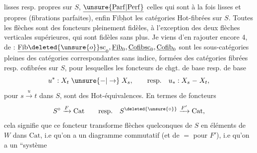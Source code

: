 lisses resp. propres sur $S$, $\underline{\unsure{\mathrm{Parf}|\mathrm{Perf}}}$ celles qui sont à la
fois lisses et propres (fibrations parfaites),
enfin $\underline{\mathrm{Fibhot}}$ les catégories Hot-fibrées sur $S$.
Toutes les flèches sont des foncteurs  pleinement fidèles, à l'exception des deux  flèches
verticales supérieures, qui sont fidèles sans plus.
Je viens d'en rajouter encore 4, de  :
$\underline{\mathrm{Fib}\deleted{\unsure{o}}\mathrm{sc}}_0,\underline{\mathrm{Fib}}_0,\underline{\mathrm{Cofibsc}}_0,\underline{\mathrm{Cofib}}_0$ sont les sous-catégories
pleines des catégories correspondantes sans indice,
formées des catégories fibrées resp. cofibrées  sur
$S$, pour lesquelles les foncteurs de chgt. de base
resp.  de base
\[
u^*:X_t\mathrel{\unsure{-|\to}}X_s,\qquad\text{resp.}\quad u_*:X_s\mathrel{-} X_t,
\]
pour $s\xrightarrow{u}t$ dans $S$, sont des $\mathrm{Hot}$-équivalences.
En termes de foncteurs
\[
S^\circ\xrightarrow{F}\mathrm{Cat}\qquad\text{resp.}\quad S^{\deleted{\unsure{\circ}}}\xrightarrow{F'}\mathrm{Cat},
\]
cela signifie que ce foncteur transforme
flèches quelconques de $S$ en éléments de
$W$ dans $\mathrm{Cat}$,  i.e qu'on a un diagramme
commutatif
(et de $=$ pour $F'$), i.e qu'on a un ``système
